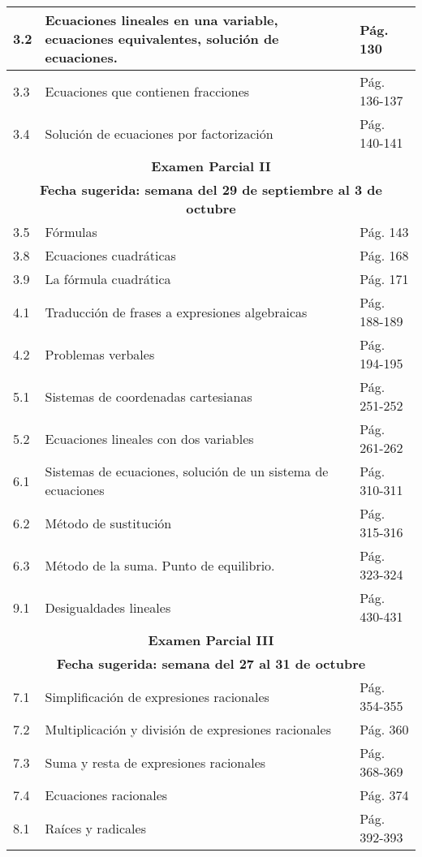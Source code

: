 \documentclass{article}
\begin{document}
\begin{longtable}{|p{}|p{}|p{}|}
    \hline
    3.2 & Ecuaciones lineales en una variable, ecuaciones equivalentes, solución de ecuaciones. & Pág. 130 \\
    \hline
    3.3 & Ecuaciones que contienen fracciones & Pág. 136-137 \\
    \hline
    3.4 & Solución de ecuaciones por factorización & Pág. 140-141 \\
    \hline
    \multicolumn{3}{|c|}{\textbf{Examen Parcial II}} \\
    \multicolumn{3}{|c|}{\textbf{Fecha sugerida: semana del 29 de septiembre al 3 de octubre}} \\
    \hline
    3.5 & Fórmulas & Pág. 143 \\
    \hline
    3.8 & Ecuaciones cuadráticas & Pág. 168 \\
    \hline
    3.9 & La fórmula cuadrática & Pág. 171 \\
    \hline
    4.1 & Traducción de frases a expresiones algebraicas & Pág. 188-189 \\
    \hline
    4.2 & Problemas verbales & Pág. 194-195 \\
    \hline
    5.1 & Sistemas de coordenadas cartesianas & Pág. 251-252 \\
    \hline
    5.2 & Ecuaciones lineales con dos variables & Pág. 261-262 \\
    \hline
    6.1 & Sistemas de ecuaciones, solución de un sistema de ecuaciones & Pág. 310-311 \\
    \hline
    6.2 & Método de sustitución & Pág. 315-316 \\
    \hline
    6.3 & Método de la suma. Punto de equilibrio. & Pág. 323-324 \\
    \hline
    9.1 & Desigualdades lineales & Pág. 430-431 \\
    \hline
    \multicolumn{3}{|c|}{\textbf{Examen Parcial III}} \\
    \multicolumn{3}{|c|}{\textbf{Fecha sugerida: semana del 27 al 31 de octubre}} \\
    \hline
    7.1 & Simplificación de expresiones racionales & Pág. 354-355 \\
    \hline
    7.2 & Multiplicación y división de expresiones racionales & Pág. 360 \\
    \hline
    7.3 & Suma y resta de expresiones racionales & Pág. 368-369 \\
    \hline
    7.4 & Ecuaciones racionales & Pág. 374 \\
    \hline
    8.1 & Raíces y radicales & Pág. 392-393 \\

\end{longtable}
\end{document}
